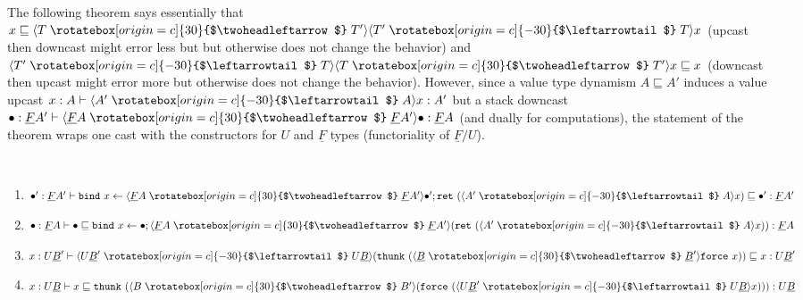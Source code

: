 \documentclass[acmsmall,screen,12pt]{acmart}
\renewcommand{\u}{\underline}
\newcommand{\ltdyn}{\sqsubseteq}
\newcommand{\uarrow}{\mathrel{\rotatebox[origin=c]{-30}{$\leftarrowtail$}}}
\newcommand{\darrow}{\mathrel{\rotatebox[origin=c]{30}{$\twoheadleftarrow$}}}
\newcommand{\upcast}[2]{\langle{#2}\uarrow{#1}\rangle}
\newcommand{\dncast}[2]{\langle{#1}\darrow{#2}\rangle}
\newcommand{\bindXtoYinZ}[2]{\kw{bind}#2 \leftarrow #1;}
\newcommand{\kw}[1]{\texttt{#1}\,\,}
\newcommand{\ret}{\kw{ret}}
\newcommand{\thunk}{\kw{thunk}}
\newcommand{\force}{\kw{force}}
\begin{document}
 The following theorem says essentially that $x \ltdyn
 \dncast{T}{T'}{\upcast{T}{T'}{x}}$ (upcast then downcast might error
 less but but otherwise does not change the behavior) and
 $\upcast{T}{T'}{\dncast{T}{T'}{x}} \ltdyn x$ (downcast then upcast
 might error more but otherwise does not change the behavior).  However,
 since a value type dynamism $A \ltdyn A'$ induces a value upcast $x :
 A \vdash \upcast{A}{A'}{x} : A'$ but a stack downcast $\bullet : \u F
 A' \vdash \dncast{\u F A}{\u F A'}{\bullet} : \u F A$ (and dually for
 computations), the statement of the theorem wraps one cast with 
 the constructors for $U$ and $\u F$ types (functoriality of $\u F/U$).
\begin{theorem} \label{thm:cast-adjunction} ~~~
  \begin{enumerate}
  \item $\bullet' : \u F A' \vdash \bindXtoYinZ{\dncast{\u F A}{\u F A'}{\bullet'}}{x}{\ret{(\upcast{A}{A'}{x})}} \ltdyn \bullet' : \u F A'$
  \item $\bullet : \u F A \vdash \bullet \ltdyn \bindXtoYinZ{\bullet}{x}{\dncast{\u F A}{\u F A'}{(\ret{(\upcast{A}{A'}{x})})}}  : \u F A$
  \item $x : U \u B' \vdash {\upcast{U \u B}{U \u B'}{(\thunk{({\dncast{\u B}{\u B'}{\force x}})})}} \ltdyn x : U \u B'$
  \item $x : U \u B \vdash x \ltdyn \thunk{(\dncast{B}{B'}{(\force{(\upcast{U \u B}{U \u B'}{x})})})} : U \u B$
  \end{enumerate}
\end{theorem}
\end{document}
